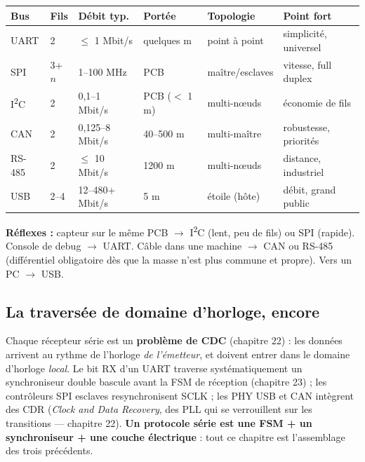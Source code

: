 \documentclass[12pt,a4paper,twoside]{book}
\begin{document}
\begin{pratique}
\begin{center}
\renewcommand{\arraystretch}{1.4}
\begin{tabular}{p{1.4cm}p{1.1cm}p{1.9cm}p{2.0cm}p{2.1cm}p{2.7cm}}
\toprule
\textbf{Bus} & \textbf{Fils} & \textbf{Débit typ.} & \textbf{Portée} & \textbf{Topologie} & \textbf{Point fort} \\
\midrule
UART & 2 & $\leq$ 1 Mbit/s & quelques m & point à point & simplicité, universel \\
SPI & 3+$n$ & 1--100 MHz & PCB & maître/\allowbreak esclaves & vitesse, full duplex \\
I\textsuperscript{2}C & 2 & 0,1--1 Mbit/s & PCB ($<$ 1 m) & multi-nœuds & économie de fils \\
CAN & 2 & 0,125--8 Mbit/s & 40--500 m & multi-maître & robustesse, priorités \\
RS-485 & 2 & $\leq$ 10 Mbit/s & 1200 m & multi-nœuds & distance, industriel \\
USB & 2--4 & 12--480+ Mbit/s & 5 m & étoile (hôte) & débit, grand public \\
\bottomrule
\end{tabular}
\end{center}

\textbf{Réflexes :} capteur sur le même PCB $\to$ I\textsuperscript{2}C (lent, peu de fils) ou SPI (rapide). Console de debug $\to$ UART. Câble dans une machine $\to$ CAN ou RS-485 (différentiel obligatoire dès que la masse n'est plus commune et propre). Vers un PC $\to$ USB.
\end{pratique}

\subsection{La traversée de domaine d'horloge, encore}

\begin{intuition}
Chaque récepteur série est un \textbf{problème de CDC} (chapitre 22) : les données arrivent au rythme de l'horloge \textit{de l'émetteur}, et doivent entrer dans le domaine d'horloge \textit{local}. Le bit RX d'un UART traverse systématiquement un synchroniseur double bascule avant la FSM de réception (chapitre 23) ; les contrôleurs SPI esclaves resynchronisent SCLK ; les PHY USB et CAN intègrent des CDR (\textit{Clock and Data Recovery}, des PLL qui se verrouillent sur les transitions --- chapitre 22). \textbf{Un protocole série est une FSM + un synchroniseur + une couche électrique} : tout ce chapitre est l'assemblage des trois précédents.
\end{intuition}
\end{document}
